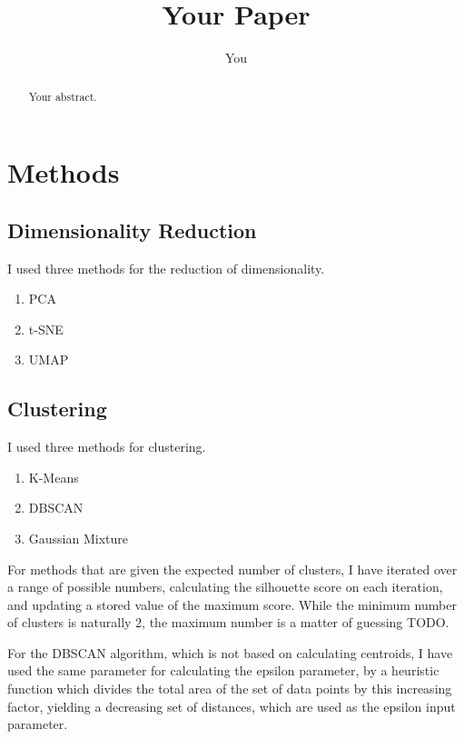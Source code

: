 \documentclass{article}
\title{Your Paper}
\author{You}
\begin{document}
\maketitle

\begin{abstract}
Your abstract.
\end{abstract}

\section{Methods}
\subsection{Dimensionality Reduction}
I used three methods for the reduction of dimensionality.
\begin{enumerate}
    \item PCA
    \item t-SNE
    \item UMAP
\end{enumerate}

\subsection{Clustering}
I used three methods for clustering.
\begin{enumerate}
    \item K-Means
    \item DBSCAN
    \item Gaussian Mixture
\end{enumerate}

For methods that are given the expected number of clusters, I have iterated over a range of possible numbers, calculating the silhouette score on each iteration, and updating a stored value of the maximum score. While the minimum number of clusters is naturally 2, the maximum number is a matter of guessing TODO.

For the DBSCAN algorithm, which is not based on calculating centroids, I have used the same parameter for calculating the epsilon parameter, by a heuristic function which divides the total area of the set of data points by this increasing factor, yielding a decreasing set of distances, which are used as the epsilon input parameter.
\end{document}
